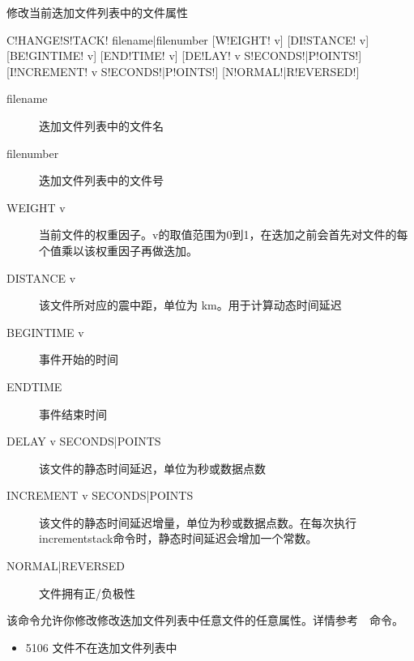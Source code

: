 \label{sss:changestack}

修改当前迭加文件列表中的文件属性

\begin{SACSTX}
C!HANGE!S!TACK! filename|filenumber [W!EIGHT! v] [DI!STANCE! v]
    [BE!GINTIME! v] [END!TIME! v] [DE!LAY! v S!ECONDS!|P!OINTS!]
    [I!NCREMENT! v S!ECONDS!|P!OINTS!] [N!ORMAL!|R!EVERSED!]
\end{SACSTX}

\begin{description}
\item [filename] 迭加文件列表中的文件名
\item [filenumber] 迭加文件列表中的文件号
\item [WEIGHT v] 当前文件的权重因子。v的取值范围为0到1，在迭加之前会首先对文件的每个值乘以该权重因子再做迭加。
\item [DISTANCE v] 该文件所对应的震中距，单位为 \si{\km}。用于计算动态时间延迟
\item [BEGINTIME v] 事件开始的时间
\item [ENDTIME] 事件结束时间
\item [DELAY v SECONDS|POINTS] 该文件的静态时间延迟，单位为秒或数据点数
\item [INCREMENT v SECONDS|POINTS] 该文件的静态时间延迟增量，单位为秒或数据点数。在每次执行incrementstack命令时，静态时间延迟会增加一个常数。
\item [NORMAL|REVERSED] 文件拥有正/负极性
\end{description}

该命令允许你修改修改迭加文件列表中任意文件的任意属性。详情参考~~命令。

\begin{itemize}
\item 5106 文件不在迭加文件列表中
\end{itemize}

